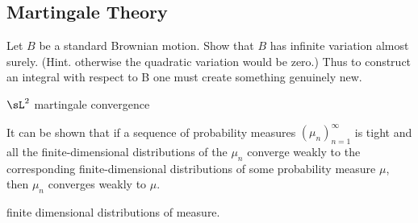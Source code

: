 







\subsection{Martingale Theory}

\begin{problem}
Let $B$ be a standard Brownian motion. Show that $B$ has infinite variation almost surely. (Hint. otherwise the quadratic variation would be zero.) Thus to construct an integral with respect to B one must create something genuinely new.
\end{problem}

\ben
\item [(i)] $\sL^2$ martingale convergence
\item [(ii)] It can be shown that if a sequence of probability measures $(\mu_{n})_{n = 1}^{\infty}$ is tight and all the finite-dimensional distributions of the $\mu_{n}$ converge weakly to the corresponding finite-dimensional distributions of some probability measure $\mu$, then $\mu_{n}$ converges weakly to $\mu$.
\item [(iii)] finite dimensional distributions of measure.
\een


